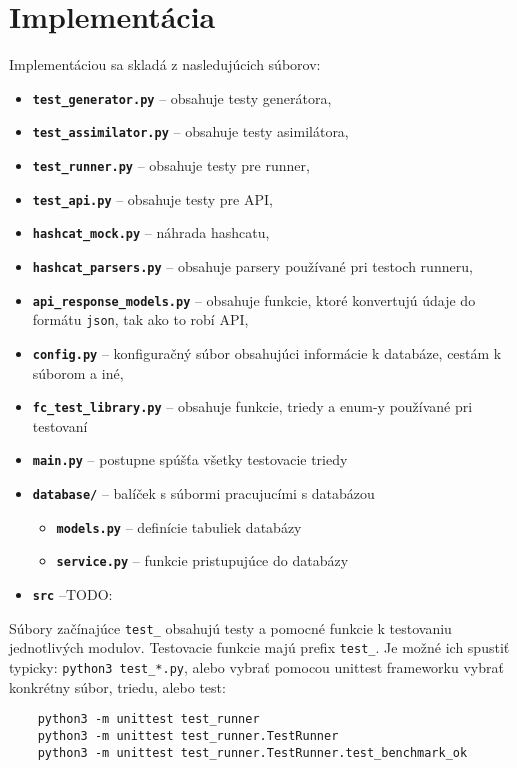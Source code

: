 \chapter{Implementácia}
Implementáciou sa skladá z nasledujúcich súborov:
\begin{itemize}
	\item \textbf{\texttt{test\_generator.py}} -- obsahuje testy generátora,
	\item \textbf{\texttt{test\_assimilator.py}} -- obsahuje testy asimilátora,
	\item \textbf{\texttt{test\_runner.py}} -- obsahuje testy pre runner,
	\item \textbf{\texttt{test\_api.py}} -- obsahuje testy pre API,
	\item \textbf{\texttt{hashcat\_mock.py}} -- náhrada hashcatu,
	\item \textbf{\texttt{hashcat\_parsers.py}} -- obsahuje parsery používané pri testoch runneru,
	\item \textbf{\texttt{api\_response\_models.py}} -- obsahuje funkcie, ktoré konvertujú údaje do formátu \texttt{json}, tak ako to robí API,
	\item \textbf{\texttt{config.py}} -- konfiguračný súbor obsahujúci informácie k databáze, cestám k súborom a iné,
	\item \textbf{\texttt{fc\_test\_library.py}} -- obsahuje funkcie, triedy a enum-y používané pri testovaní
	\item \textbf{\texttt{main.py}} -- postupne spúšťa všetky testovacie triedy
	\item \textbf{\texttt{database/}} -- balíček s súbormi pracujucími s databázou
		\begin{itemize}
			\item \textbf{\texttt{models.py}} -- definície tabuliek databázy
			\item \textbf{\texttt{service.py}} -- funkcie pristupujúce do databázy
		\end{itemize}
	\item \textbf{\texttt{src}} --TODO: 
\end{itemize}
Súbory začínajúce \texttt{test\_} obsahujú testy a pomocné funkcie k testovaniu jednotlivých modulov.
Testovacie funkcie majú prefix \texttt{test\_}.
Je možné ich spustiť typicky: \texttt{python3 test\_*.py}, alebo vybrať pomocou unittest frameworku vybrať konkrétny súbor, triedu, alebo test:
\begin{verbatim}
	python3 -m unittest test_runner
	python3 -m unittest test_runner.TestRunner
	python3 -m unittest test_runner.TestRunner.test_benchmark_ok
\end{verbatim}


